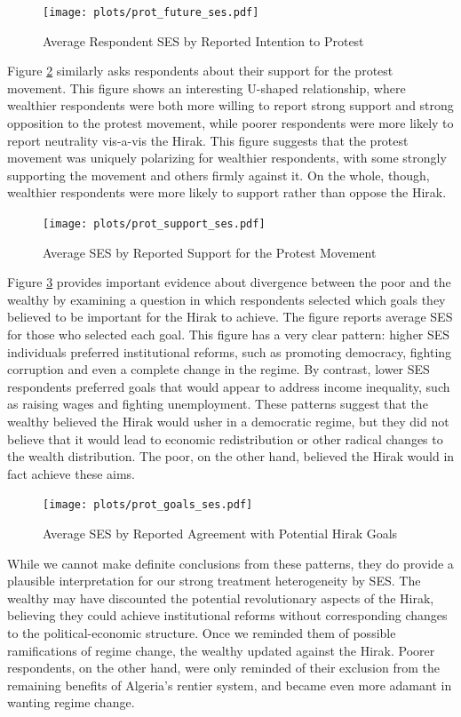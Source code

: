 \documentclass[12pt, letterpaper]{article}
\begin{document}
\begin{figure}
    \centering
    \texttt{[image: plots/prot\_future\_ses.pdf]}
    \caption{Average Respondent SES by Reported Intention to Protest}
    \label{fig:ses_prot}
\end{figure}

Figure \ref{ses_prot_support} similarly asks respondents about their support for the protest movement. This figure shows an interesting U-shaped relationship, where wealthier respondents were both more willing to report strong support and strong opposition to the protest movement, while poorer respondents were more likely to report neutrality vis-a-vis the Hirak. This figure suggests that the protest movement was uniquely polarizing for wealthier respondents, with some strongly supporting the movement and others firmly against it. On the whole, though, wealthier respondents were more likely to support rather than oppose the Hirak.

\begin{figure}
    \centering
    \texttt{[image: plots/prot\_support\_ses.pdf]}
    \caption{Average SES by Reported Support for the Protest Movement}
    \label{ses_prot_support}
\end{figure}

Figure \ref{plots/prot_goals} provides important evidence about divergence between the poor and the wealthy by examining a question in which respondents selected which goals they believed to be important for the Hirak to achieve. The figure reports average SES for those who selected each goal. This figure has a very clear pattern: higher SES individuals preferred institutional reforms, such as promoting democracy, fighting corruption and even a complete change in the regime. By contrast, lower SES respondents preferred goals that would appear to address income inequality, such as raising wages and fighting unemployment. These patterns suggest that the wealthy believed the Hirak would usher in a democratic regime, but they did not believe that it would lead to economic redistribution or other radical changes to the wealth distribution. The poor, on the other hand, believed the Hirak would in fact achieve these aims.

\begin{figure}
    \centering
    \texttt{[image: plots/prot\_goals\_ses.pdf]}
    \caption{Average SES by Reported Agreement with Potential Hirak Goals}
    \label{plots/prot_goals}
\end{figure}

While we cannot make definite conclusions from these patterns, they do provide a plausible interpretation for our strong treatment heterogeneity by SES. The wealthy may have discounted the potential revolutionary aspects of the Hirak, believing they could achieve institutional reforms without corresponding changes to the political-economic structure. Once we reminded them of possible ramifications of regime change, the wealthy updated against the Hirak. Poorer respondents, on the other hand, were only reminded of their exclusion from the remaining benefits of Algeria's rentier system, and became even more adamant in wanting regime change. 
\end{document}
